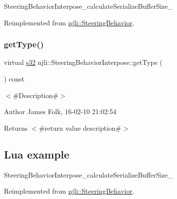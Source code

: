 \begin{DoxyCodeInclude}
\end{DoxyCodeInclude}
Steering\+Behavior\+Interpose\+\_\+calculate\+Serialize\+Buffer\+Size\+\_\+ 

Reimplemented from \mbox{\hyperlink{classnjli_1_1_steering_behavior_abb58d6982dc295fc3e90f096f51b0ef8}{njli\+::\+Steering\+Behavior}}.

\mbox{\label{classnjli_1_1_steering_behavior_interpose_a40ac76bd649350055bfb160248c48c9d}} 
\subsubsection{\texorpdfstring{get\+Type()}{getType()}}
{\footnotesize\ttfamily virtual \mbox{\hyperlink{_util_8h_aa62c75d314a0d1f37f79c4b73b2292e2}{s32}} njli\+::\+Steering\+Behavior\+Interpose\+::get\+Type (\begin{DoxyParamCaption}{ }\end{DoxyParamCaption}) const\hspace{0.3cm}{\ttfamily [virtual]}}



$<$\#\+Description\#$>$ 

\begin{DoxyAuthor}{Author}
James Folk, 16-\/02-\/10 21\+:02\+:54
\end{DoxyAuthor}
\begin{DoxyReturn}{Returns}
$<$\#return value description\#$>$
\end{DoxyReturn}
\hypertarget{classnjli_1_1_steering_behavior_wander_ex1}{}\subsection{Lua example}\label{classnjli_1_1_steering_behavior_wander_ex1}

\begin{DoxyCodeInclude}
\end{DoxyCodeInclude}
Steering\+Behavior\+Interpose\+\_\+calculate\+Serialize\+Buffer\+Size\+\_\+ 

Reimplemented from \mbox{\hyperlink{classnjli_1_1_steering_behavior_ae82bca8468d41aff8c22b76fd359fe9b}{njli\+::\+Steering\+Behavior}}.

